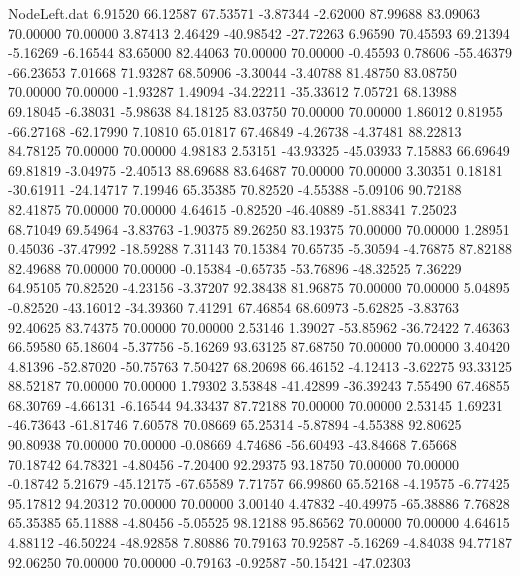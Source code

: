 \begin{filecontents}{NodeLeft.dat}
   6.91520   66.12587   67.53571    -3.87344   -2.62000   87.99688   83.09063   70.00000   70.00000    3.87413    2.46429  -40.98542  -27.72263
   6.96590   70.45593   69.21394    -5.16269   -6.16544   83.65000   82.44063   70.00000   70.00000   -0.45593    0.78606  -55.46379  -66.23653
   7.01668   71.93287   68.50906    -3.30044   -3.40788   81.48750   83.08750   70.00000   70.00000   -1.93287    1.49094  -34.22211  -35.33612
   7.05721   68.13988   69.18045    -6.38031   -5.98638   84.18125   83.03750   70.00000   70.00000    1.86012    0.81955  -66.27168  -62.17990
   7.10810   65.01817   67.46849    -4.26738   -4.37481   88.22813   84.78125   70.00000   70.00000    4.98183    2.53151  -43.93325  -45.03933
   7.15883   66.69649   69.81819    -3.04975   -2.40513   88.69688   83.64687   70.00000   70.00000    3.30351    0.18181  -30.61911  -24.14717
   7.19946   65.35385   70.82520    -4.55388   -5.09106   90.72188   82.41875   70.00000   70.00000    4.64615   -0.82520  -46.40889  -51.88341
   7.25023   68.71049   69.54964    -3.83763   -1.90375   89.26250   83.19375   70.00000   70.00000    1.28951    0.45036  -37.47992  -18.59288
   7.31143   70.15384   70.65735    -5.30594   -4.76875   87.82188   82.49688   70.00000   70.00000   -0.15384   -0.65735  -53.76896  -48.32525
   7.36229   64.95105   70.82520    -4.23156   -3.37207   92.38438   81.96875   70.00000   70.00000    5.04895   -0.82520  -43.16012  -34.39360
   7.41291   67.46854   68.60973    -5.62825   -3.83763   92.40625   83.74375   70.00000   70.00000    2.53146    1.39027  -53.85962  -36.72422
   7.46363   66.59580   65.18604    -5.37756   -5.16269   93.63125   87.68750   70.00000   70.00000    3.40420    4.81396  -52.87020  -50.75763
   7.50427   68.20698   66.46152    -4.12413   -3.62275   93.33125   88.52187   70.00000   70.00000    1.79302    3.53848  -41.42899  -36.39243
   7.55490   67.46855   68.30769    -4.66131   -6.16544   94.33437   87.72188   70.00000   70.00000    2.53145    1.69231  -46.73643  -61.81746
   7.60578   70.08669   65.25314    -5.87894   -4.55388   92.80625   90.80938   70.00000   70.00000   -0.08669    4.74686  -56.60493  -43.84668
   7.65668   70.18742   64.78321    -4.80456   -7.20400   92.29375   93.18750   70.00000   70.00000   -0.18742    5.21679  -45.12175  -67.65589
   7.71757   66.99860   65.52168    -4.19575   -6.77425   95.17812   94.20312   70.00000   70.00000    3.00140    4.47832  -40.49975  -65.38886
   7.76828   65.35385   65.11888    -4.80456   -5.05525   98.12188   95.86562   70.00000   70.00000    4.64615    4.88112  -46.50224  -48.92858
   7.80886   70.79163   70.92587    -5.16269   -4.84038   94.77187   92.06250   70.00000   70.00000   -0.79163   -0.92587  -50.15421  -47.02303

\end{filecontents}
